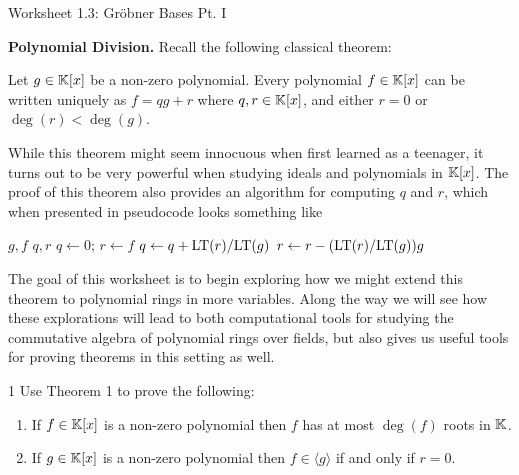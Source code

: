 \documentclass[Notebook.tex]{subfiles}
\begin{document}
\ifSubfilesClassLoaded{
    
}{}

\begin{center}
    {Worksheet 1.3: Gr\"{o}bner Bases Pt. I}
\end{center}

 \textbf{Polynomial Division.} Recall the following classical theorem: 

\begin{theorem}\label{thm:division-alg}
Let $g \in \mathbb K[x]$ be a non-zero polynomial. Every polynomial $f\in \mathbb K[x]$ can be written uniquely as $f=qg+r$ where $q,r \in \mathbb K[x]$, and either $r=0$ or $\deg(r) < \deg(g)$. 
\end{theorem}

While this theorem might seem innocuous when first learned as a teenager, it turns out to be very powerful when studying ideals and polynomials in $\mathbb K[x]$. The proof of this theorem also provides an algorithm for computing $q$ and $r$, which when presented in pseudocode looks something like

\begin{algorithm}
\caption{Division Algorithm}
\begin{algorithmic}
\Require $g, f$
\Ensure $q, r$
\State $q \gets 0$; $r \gets f$
    \State $q \gets q + \text{LT}(r)/\text{LT}(g)$
    \State $r \gets r - (\text{LT}(r)/\text{LT}(g))g$
\EndWhile
\end{algorithmic}
\end{algorithm}

The goal of this worksheet is to begin exploring how we might extend this theorem to polynomial rings in more variables. Along the way we will see how these explorations will lead to both computational tools for studying the commutative algebra of polynomial rings over fields, but also gives us useful tools for proving theorems in this setting as well. 

\newpage 

\begin{problem}{1}
Use Theorem 1 to prove the following:
    \begin{enumerate}[label=(\alph*),ref=\theenumi\alph*]
        \item If $f\in \mathbb K[x]$ is a non-zero polynomial then $f$ has at most $\deg(f)$ roots in $\mathbb K$.
        \item If $g\in \mathbb K[x]$ is a non-zero polynomial then $f \in \langle g \rangle$ if and only if $r=0$. 
    \end{enumerate}
\end{problem}
\end{document}
